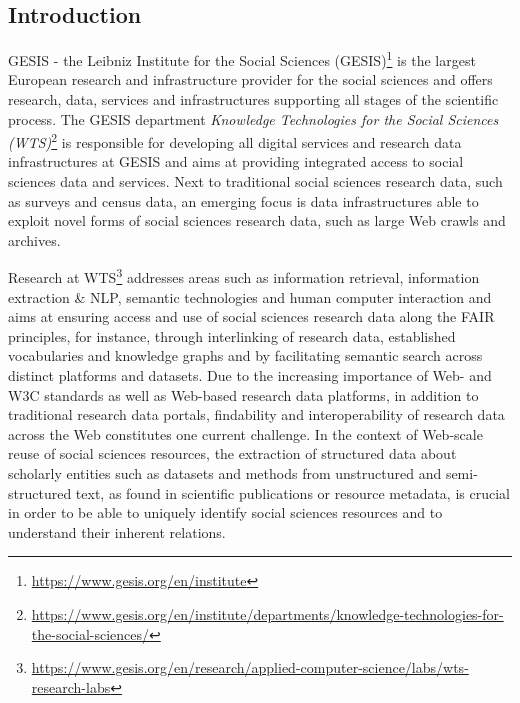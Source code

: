\subsection {Introduction}


GESIS - the Leibniz Institute for the Social Sciences (GESIS)\footnote{\url{https://www.gesis.org/en/institute}} is the largest European research and infrastructure provider for the social sciences and offers research, data, services and infrastructures supporting all stages of the scientific process. The GESIS department \textit{Knowledge Technologies for the Social Sciences (WTS)}\footnote{\url{ https://www.gesis.org/en/institute/departments/knowledge-technologies-for-the-social-sciences/}} is responsible for developing all digital services and research data infrastructures at GESIS and aims at providing integrated access to social sciences data and services. Next to traditional social sciences research data, such as surveys and census data, an emerging focus is data infrastructures able to exploit novel forms of social sciences research data, such as large Web crawls and archives. 

Research at WTS\footnote{\url{https://www.gesis.org/en/research/applied-computer-science/labs/wts-research-labs}} addresses areas such as information retrieval, information extraction {\&} NLP, semantic technologies and human computer interaction and aims at ensuring access and use of social sciences research data along the FAIR principles, for instance, through interlinking of research data, established vocabularies and knowledge graphs and by facilitating semantic search across distinct platforms and datasets. Due to the increasing importance of Web- and W3C standards as well as Web-based research data platforms, in addition to traditional research data portals, findability and interoperability of research data across the Web constitutes one current challenge. In the context of Web-scale reuse of social sciences resources, the extraction of structured data about scholarly entities such as datasets and methods from unstructured and semi-structured text, as found in scientific publications or resource metadata, is crucial in order to be able to uniquely identify social sciences resources and to understand their inherent relations. 

